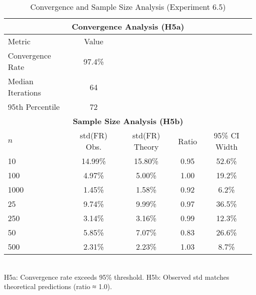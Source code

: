 \begin{table}[htbp]
\centering
\caption{Convergence and Sample Size Analysis (Experiment 6.5)}
\label{tab:exp_6_5_results}
\begin{tabular}{lcccc}
\toprule
\multicolumn{5}{c}{\textbf{Convergence Analysis (H5a)}} \\
\midrule
Metric & Value & & & \\
\midrule
Convergence Rate & 97.4\% & & & \\
Median Iterations & 64 & & & \\
95th Percentile & 72 & & & \\
\midrule
\multicolumn{5}{c}{\textbf{Sample Size Analysis (H5b)}} \\
\midrule
$n$ & std(FR) Obs. & std(FR) Theory & Ratio & 95\% CI Width \\
\midrule
10 & 14.99\% & 15.80\% & 0.95 & 52.6\% \\
100 & 4.97\% & 5.00\% & 1.00 & 19.2\% \\
1000 & 1.45\% & 1.58\% & 0.92 & 6.2\% \\
25 & 9.74\% & 9.99\% & 0.97 & 36.5\% \\
250 & 3.14\% & 3.16\% & 0.99 & 12.3\% \\
50 & 5.85\% & 7.07\% & 0.83 & 26.6\% \\
500 & 2.31\% & 2.23\% & 1.03 & 8.7\% \\
\bottomrule
\end{tabular}
\\[0.5em] {\footnotesize H5a: Convergence rate exceeds 95\% threshold. H5b: Observed std matches theoretical predictions (ratio ≈ 1.0).}
\end{table}